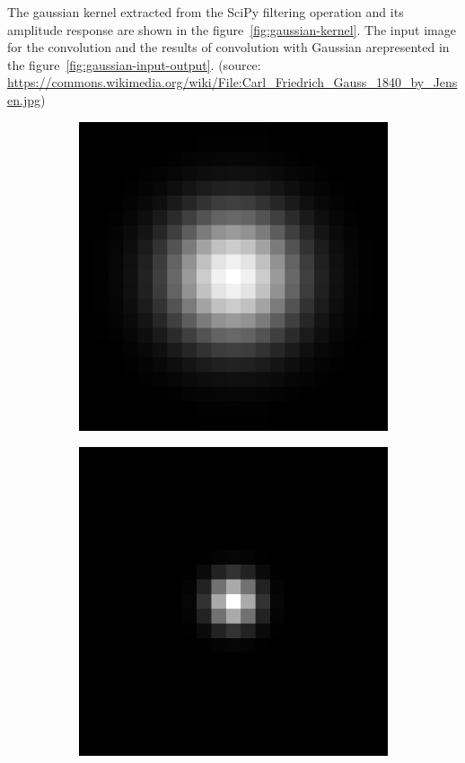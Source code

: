 \documentclass[]{article}
\begin{document}
The gaussian kernel extracted from the SciPy filtering operation and its
amplitude response are shown in the figure~\ref{fig:gaussian-kernel}. The input
image for the convolution and the results of convolution with Gaussian
arepresented in the figure~\ref{fig:gaussian-input-output}. (source:
\url{https://commons.wikimedia.org/wiki/File:Carl_Friedrich_Gauss_1840_by_Jensen.jpg})
\begin{figure}
  \label{fig:gaussian-kernel}
  \centering
    \begin{subfigure}[t]{0.49\textwidth}
      \centering
      \includegraphics[width=0.99\linewidth]{kernel.png}
    \end{subfigure}
    \begin{subfigure}[t]{0.49\textwidth}
      \centering
      \includegraphics[width=0.99\linewidth]{freq.png}

\end{subfigure}
\end{figure}
\end{document}
